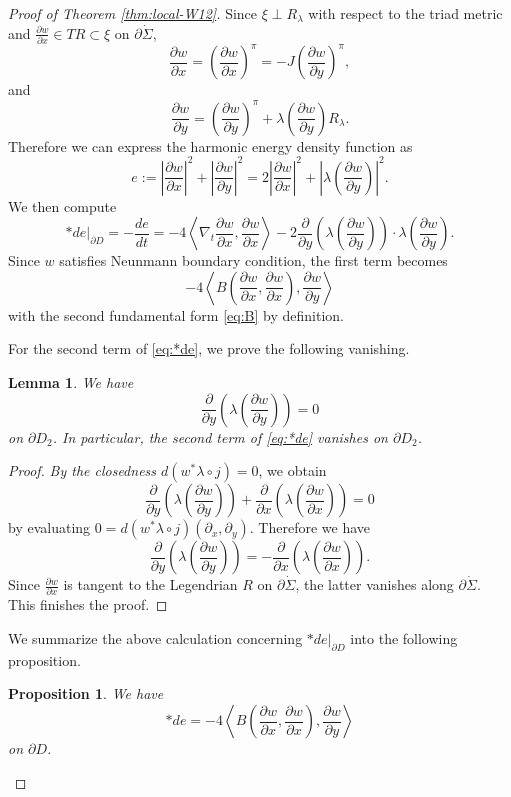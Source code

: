 \documentclass[reqno]{amsart}
\newcommand{\del}{\partial}
\newcommand{\be}{\begin{equation}}
\newcommand{\ee}{\end{equation}}
\theoremstyle{theorem}
\newtheorem{lem}[thm]{Lemma}
\newtheorem{prop}[thm]{Proposition}
\theoremstyle{definition}
\numberwithin{equation}{section}
\begin{document}
\begin{proof} [Proof of Theorem \ref{thm:local-W12}]
Since $\xi \perp R_\lambda$ with respect to the triad metric and $\frac{\del w}{\del x} \in TR \subset \xi$ on $\del \dot \Sigma$,
$$
\frac{\del w}{\del x} = \left(\frac{\del w}{\del x}\right)^\pi = - J \left(\frac{\del w}{\del y}\right)^\pi,
$$
and
$$
\frac{\del w}{\del y} = \left(\frac{\del w}{\del y}\right)^\pi + \lambda\left(\frac{\del w}{\del y}\right)
R_\lambda.
$$
Therefore we can express the harmonic energy density function as
$$
e := \left|\frac{\del w}{\del x}\right|^2 + \left|\frac{\del w}{\del y}\right|^2
= 2 \left|\frac{\del w}{\del x}\right|^2 + \left|\lambda\left(\frac{\del w}{\del y}\right)\right|^2.
$$
We then compute
\be\label{eq:*de}
*de|_{\del D} = -\frac{de}{dt} = -4 \left\langle \nabla_t \frac{\del w}{\del x},\frac{\del w}{\del x} \right\rangle
- 2 \frac{\del}{\del y}\left(\lambda\left(\frac{\del w}{\del y}\right)\right)
\cdot \lambda\left(\frac{\del w}{\del y}\right).
\ee
Since $w$ satisfies Neunmann boundary condition, the first term becomes
\be\label{eq:-B}
- 4\left \langle B\left(\frac{\del w}{\del x},\frac{\del w}{\del x}\right),\frac{\del w}{\del y}\right \rangle
\ee
with the second fundamental form \eqref{eq:B} by definition.

For the second term of \eqref{eq:*de}, we prove the following vanishing.
\begin{lem} We have
\be\label{eq:dtdtdw}
 \frac{\del}{\del y}\left(\lambda\left(\frac{\del w}{\del y}\right)\right) = 0
 \ee
 on $\del D_2$.
 In particular, the second term of \eqref{eq:*de} vanishes on $\del D_2$.
\end{lem}
\begin{proof} \emph{By the closedness $d(w^*\lambda \circ j) = 0$}, we obtain
$$
 \frac{\del}{\del y}\left(\lambda\left(\frac{\del w}{\del y}\right)\right)
 +  \frac{\del}{\del x}\left(\lambda\left(\frac{\del w}{\del x}\right)\right) = 0
 $$
  by evaluating $0 = d(w^*\lambda \circ j)(\del_x,\del_y)$.
 Therefore we have
 $$
  \frac{\del}{\del y}\left(\lambda\left(\frac{\del w}{\del y}\right)\right)
 = - \frac{\del}{\del x}\left(\lambda\left(\frac{\del w}{\del x}\right)\right).
 $$
 Since $\frac{\del w}{\del x}$ is tangent to the Legendrian
 $R$ on $\del \dot \Sigma$, the latter vanishes along $\del \dot \Sigma$.
 This finishes the proof.
 \end{proof}

We summarize the above calculation
concerning $*de|_{\del D}$ into the following proposition.

\begin{prop}\label{prop:*de|delD} We have
\be\label{eq:*de-on-bdy}
* de = - 4 \left \langle B\left(\frac{\del w}{\del x},\frac{\del w}{\del x}\right),
\frac{\del w}{\del y}\right \rangle
\ee
on $\del D$.
\end{prop}


\end{proof}
\end{document}
